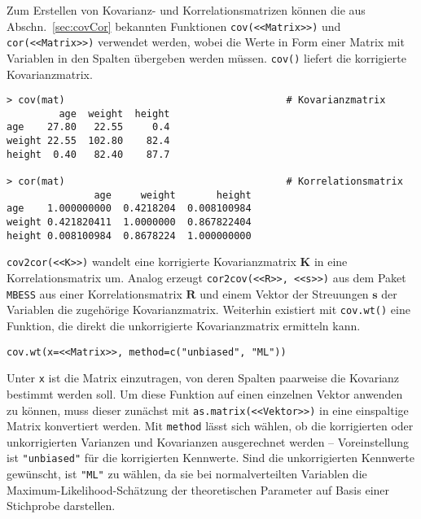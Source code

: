 Zum Erstellen von Kovarianz- und Korrelationsmatrizen können die aus Abschn.\ \ref{sec:covCor} bekannten Funktionen \lstinline!cov(<<Matrix>>)! und \lstinline!cor(<<Matrix>>)! verwendet werden, wobei die Werte in Form einer Matrix mit Variablen in den Spalten übergeben werden müssen. \lstinline!cov()! liefert die korrigierte Kovarianzmatrix.
\begin{lstlisting}
> cov(mat)                                      # Kovarianzmatrix
         age  weight  height
age    27.80   22.55     0.4
weight 22.55  102.80    82.4
height  0.40   82.40    87.7

> cor(mat)                                      # Korrelationsmatrix
               age     weight       height
age    1.000000000  0.4218204  0.008100984
weight 0.421820411  1.0000000  0.867822404
height 0.008100984  0.8678224  1.000000000
\end{lstlisting}

\lstinline!cov2cor(<<K>>)! wandelt eine korrigierte Kovarianzmatrix $\bm{K}$ in eine Korrelationsmatrix um. Analog erzeugt \lstinline!cor2cov(<<R>>, <<s>>)! aus dem Paket \lstinline!MBESS! \cite{Kelley2010} aus einer Korrelationsmatrix $\bm{R}$ und einem Vektor der Streuungen $\bm{s}$ der Variablen die zugehörige Kovarianzmatrix. Weiterhin existiert mit \lstinline!cov.wt()! eine Funktion, die direkt die unkorrigierte Kovarianzmatrix ermitteln kann.
\begin{lstlisting}
cov.wt(x=<<Matrix>>, method=c("unbiased", "ML"))
\end{lstlisting}

Unter \lstinline!x! ist die Matrix einzutragen, von deren Spalten paarweise die Kovarianz bestimmt werden soll. Um diese Funktion auf einen einzelnen Vektor anwenden zu können, muss dieser zunächst mit \lstinline!as.matrix(<<Vektor>>)! in eine einspaltige Matrix konvertiert werden. Mit \lstinline!method! lässt sich wählen, ob die korrigierten oder unkorrigierten Varianzen und Kovarianzen ausgerechnet werden -- Voreinstellung ist \lstinline!"unbiased"! für die korrigierten Kennwerte. Sind die unkorrigierten Kennwerte gewünscht, ist \lstinline!"ML"! zu wählen, da sie bei normalverteilten Variablen die Maximum-Likelihood-Schätzung der theoretischen Parameter auf Basis einer Stichprobe darstellen.

